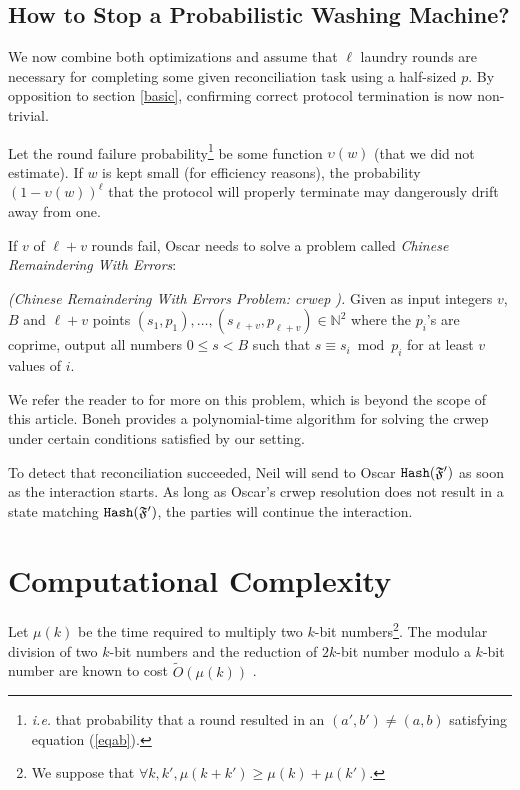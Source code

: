 \documentclass[11pt]{llncs}
\newcommand{\Oapp}{\ensuremath{\tilde{O}}}
\begin{document}
\subsection{How to Stop a Probabilistic Washing Machine?} We now combine both optimizations and assume that $\ell$ laundry rounds are necessary for completing some given reconciliation task using a half-sized $p$. By opposition to section \ref{basic}, confirming correct protocol termination is now non-trivial.\smallskip

Let the round failure probability\footnote{{\sl i.e.} that probability that a round resulted in an $(a',b')\neq (a,b)$ satisfying equation (\ref{eqab}).} be some function $\upsilon(w)$ (that we did not estimate). If $w$ is kept small (for efficiency reasons), the probability $\left(1-\upsilon(w)\right)^{\ell}$ that the protocol will properly terminate may dangerously drift away from one.\smallskip

If $v$ of $\ell+v$ rounds fail, Oscar needs to solve a problem called {\sl Chinese Remaindering With Errors}:\smallskip

\begin{problem}{\sl (Chinese Remaindering With Errors Problem: {\sc crwep} \cite{phong}).} Given as input integers $v$, $B$ and $\ell+v$ points $(s_1,p_1),\ldots,(s_{\ell+v},p_{\ell+v})\in \mathbb{N}^2$ where the $p_i$'s are coprime, output all numbers $0 \leq s < B$ such that $s \equiv s_i \bmod p_i$ for at least $v$ values of $i$.
\end{problem}

We refer the reader to \cite{phong} for more on this problem, which is beyond the scope of this article. Boneh \cite{boneh} provides a polynomial-time algorithm for solving the {\sc crwep} under certain conditions satisfied by our setting.\smallskip

To detect that reconciliation succeeded, Neil will send to Oscar $\mbox{{\tt Hash}}(\mathfrak{F}')$ as soon as the interaction starts. As long as Oscar's {\sc crwep} resolution does not result in a state matching $\mbox{{\tt Hash}}(\mathfrak{F}')$, the parties will continue the interaction.

\section{Computational Complexity}

Let $\mu(k)$ be the time required to multiply two $k$-bit numbers\footnote{We suppose that $\forall k,k', \mu(k+k') \ge \mu(k) + \mu(k')$.}.
The modular division of two $k$-bit numbers and the reduction of $2k$-bit number modulo a $k$-bit number are known to cost $\Oapp(\mu(k))$ \cite{burnikel1998fast}.\smallskip
\end{document}
